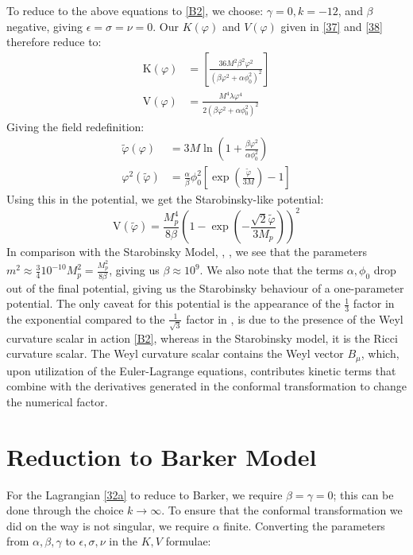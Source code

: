\documentclass[aps,prd,reprint,preprintnumbers,showpacs,floatfix,nofootinbib,superscript address]{revtex4-2}
\begin{document}
To reduce to the above equations to \ref{B2}, we choose: $\gamma = 0, k = -12$, and $\beta$ negative, giving $\epsilon = \sigma = \nu = 0$. Our $K(\varphi)$ and $V(\varphi)$ given in \ref{37} and \ref{38} therefore reduce to:
\begin{align}
    \text{K}(\varphi) &= \left[\frac{36 M^2 \beta^2 \varphi^2}{ (\beta \varphi^2 + \alpha \phi_0^2)^2}\right] \\
    \text{V}(\varphi) &= \frac{ M^4 \lambda \varphi^4}{2(\beta \varphi^2 + \alpha \phi_0^2)^2}    
\end{align}
Giving the field redefinition:
\begin{align}
    \tilde{\varphi}(\varphi) &= 3M \ln\left(1 + \frac{\beta \varphi^2}{\alpha \phi_0^2} \right) \nonumber \\
    \varphi^2(\tilde{\varphi}) &=  \frac{\alpha}{\beta} \phi_0^2\left [ \exp\left(\frac{\tilde{\varphi}}{3M}\right) -1\right]
\end{align}
Using this in the potential, we get the Starobinsky-like potential:
\begin{equation}
    \text{V}(\tilde{\varphi}) = \frac{ M_p^4}{8 \beta}  \left(1 - \exp\left(-\frac{\sqrt{2} \tilde{\varphi}}{3 M_p}\right)\right)^2
\end{equation}
In comparison with the Starobinsky Model, \cite{ivanov2022analytic}, \cite{lust2024starobinsky}, we see that the parameters $m^2 \approx \frac{3}{4} 10^{-10}M_p^2 =\frac{M_p^2}{8\beta}$, giving us $\beta \approx 10^{9}$. We also note that the terms $\alpha, \phi_0$ drop out of the final potential, giving us the Starobinsky behaviour of a one-parameter potential. The only caveat for this potential is the appearance of the $\frac{1}{3}$ factor in the exponential compared to the $\frac{1}{\sqrt{3}}$ factor in \cite{lust2024starobinsky}, is due to the presence of the Weyl curvature scalar in action \ref{B2}, whereas in the Starobinsky model, it is the Ricci curvature scalar. The Weyl curvature scalar contains the Weyl vector $B_\mu$, which, upon utilization of the Euler-Lagrange equations, contributes kinetic terms that combine with the derivatives generated in the conformal transformation to change the numerical factor.

\section{Reduction to Barker Model}
For the Lagrangian \ref{32a} to reduce to Barker, we require $\beta = \gamma =0$; this can be done through the choice $k \rightarrow\infty$. To ensure that the conformal transformation we did on the way is not singular, we require $\alpha$ finite. Converting the parameters from $\alpha, \beta, \gamma$ to $\epsilon, \sigma, \nu$ in the $K,V$ formulae: \cite{caputa_cosmology_2013}
\end{document}
